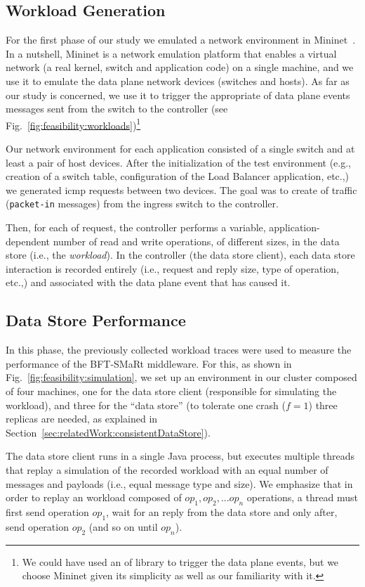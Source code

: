 \subsection{Workload Generation}
For the first phase of our study we emulated a network environment in Mininet~\cite{Handigol:2012tg}. 
In a nutshell, Mininet is a network emulation platform that enables a virtual network (a real kernel, switch and application code) on a single machine, and we use it to emulate the data plane network devices (switches and hosts). 
As far as our study is concerned, we use it to trigger the appropriate \gls{of} data plane events messages sent from the switch to the controller (see Fig.~\ref{fig:feasibility:workloads})\footnote{We could have used an \gls{of} library to trigger the data plane events, but we choose Mininet given its simplicity as well as our familiarity with it.} 

Our network environment for each application consisted  of a single switch and at least a pair of host devices.
After the initialization of the test environment (e.g., creation of a switch table, configuration of the Load Balancer application, etc.,) we  generated \gls{icmp} requests between two devices. 
The goal was to create \gls{of}  traffic (\texttt{packet-in} messages) from the ingress switch to the controller. 

Then, for each \gls{of} request, the controller performs a variable, application-dependent number of read and write operations, of different sizes, in the data store (i.e., the \textit{workload}). 
In the controller (the data store client),  each data store interaction is recorded entirely (i.e., request and reply size, type of operation, etc.,) and associated with the data plane event that has caused it. 

\subsection{ Data Store Performance}
In this phase, the previously collected workload traces were used to measure the performance of the BFT-SMaRt middleware. 
For this, as shown in Fig.~\ref{fig:feasibility:simulation}, we set up an environment in our cluster composed of four machines, one for the data store client (responsible for simulating the workload), and three for the ``data store'' (to tolerate one crash ($f=1$) three replicas are needed, as explained in Section~\ref{sec:relatedWork:consistentDataStore}). 

The data store client runs in a single Java process, but executes multiple threads that replay a simulation of the recorded workload with an equal number of messages and payloads (i.e., equal message type and size). 
We emphasize  that in order to replay an workload composed of $op_1,op_2,...op_n$ operations, a thread must first send operation $op_1$, wait for an reply from the data store and only after, send operation $op_2$ (and so on until $op_n$). 

